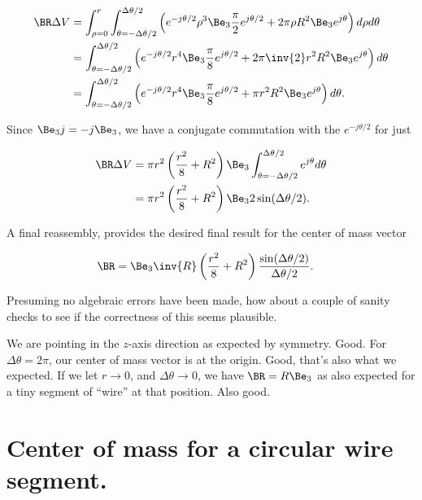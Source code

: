 \begin{align}\label{eqn:torusCenterOfMass:11}
\BR \Delta V 
&= 
\int_{\rho=0}^r \int_{\theta=-\Delta \theta/2}^{\Delta \theta/2} 
\left( e^{-j\theta/2} \rho^3 \Be_3 \frac{\pi}{2} e^{j \theta/2} + 2 \pi \rho R^2 \Be_3 e^{j \theta}  \right) d\rho d\theta \\
&= 
\int_{\theta=-\Delta \theta/2}^{\Delta \theta/2} 
\left( e^{-j\theta/2} r^4 \Be_3 \frac{\pi}{8} e^{j \theta/2} + 2\pi \inv{2} r^2 R^2 \Be_3 e^{j \theta}  \right) d\theta \\
&= 
\int_{\theta=-\Delta \theta/2}^{\Delta \theta/2} 
\left( e^{-j\theta/2} r^4 \Be_3 \frac{\pi}{8} e^{j \theta/2} + \pi r^2 R^2 \Be_3 e^{j \theta}  \right) d\theta.
\end{align}

Since $\Be_3 j = -j \Be_3$, we have a conjugate commutation with the $e^{-j \theta/2}$ for just

\begin{align}\label{eqn:torusCenterOfMass:12}
\BR \Delta V 
&= 
\pi r^2 \left( \frac{r^2}{8} + R^2 \right) \Be_3 
\int_{\theta=-\Delta \theta/2}^{\Delta \theta/2} 
e^{j \theta} d\theta \\
&= 
\pi r^2 \left( \frac{r^2}{8} + R^2 \right) \Be_3 
2 \sin(\Delta \theta/2).
\end{align}

A final reassembly, provides the desired final result for the center of mass vector

\begin{align}\label{eqn:torusCenterOfMass:13}
\BR &= \Be_3 \inv{R} \left( \frac{r^2}{8} + R^2 \right) \frac{\sin(\Delta \theta/2)}{ \Delta \theta/2 }.
\end{align}

Presuming no algebraic errors have been made, how about a couple of sanity checks to see if the correctness of this seems plausible.

We are pointing in the $z$-axis direction as expected by symmetry.  Good.  For $\Delta \theta = 2 \pi$, our center of mass vector is at the origin.  Good, that's also what we expected.  If we let $r \rightarrow 0$, and $\Delta \theta \rightarrow 0$, we have $\BR = R \Be_3$ as also expected for a tiny segment of ``wire'' at that position.  Also good.

\section{Center of mass for a circular wire segment.}

